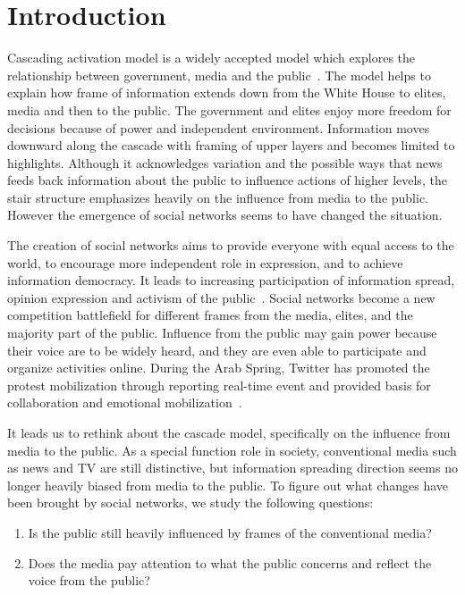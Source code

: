 \section{Introduction}
\label{sec:intro}

Cascading activation model is a widely accepted model which explores the relationship between government, media and the public~\cite{entman1993framing}. The model helps to explain how frame of information extends down from the White House to elites, media and then to the public. The government and elites enjoy more freedom for decisions because of power and independent environment. Information moves downward along the cascade with framing of upper layers and becomes limited to highlights. Although it acknowledges variation and the possible ways that news feeds back information about the public to influence actions of higher levels, the stair structure emphasizes heavily on the influence from media to the public. However the emergence of social networks seems to have changed the situation.

The creation of social networks aims to provide everyone with equal access to the world, to encourage more independent role in expression, and to achieve information democracy. It leads to increasing participation of information spread, opinion expression and activism of the public~\cite{kelly2006protest,gonzalez2011dynamics,tufekci2012social}. Social networks become a new competition battlefield for different frames from the media, elites, and the majority part of the public. Influence from the public may gain power because their voice are to be widely heard, and they are even able to participate and organize activities online. During the Arab Spring, Twitter has promoted the protest mobilization through reporting real-time event and provided basis for collaboration and emotional mobilization~\cite{breuer2014social}.

It leads us to rethink about the cascade model, specifically on the influence from media to the public. As a special function role in society, conventional media such as news and TV are still distinctive, but information spreading direction seems no longer heavily biased from media to the public. To figure out what changes have been brought by social networks, we study the following questions:

\begin{enumerate}
\item Is the public still heavily influenced by frames of the conventional media?
\item Does the media pay attention to what the public concerns and reflect the voice from the public?
\end{enumerate}


